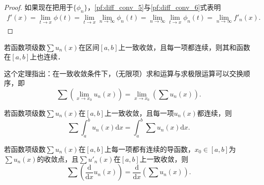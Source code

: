 \documentclass[../../main.tex]{subfiles}%
\begin{document}
\begin{proof}
如果现在把用于$\{\phi_n\}$，\eqref{pf:diff_conv_5}与\eqref{pf:diff_conv_6}式表明
\begin{align*}
f\prime \left( x \right) =\lim_{t\rightarrow x} \phi \left( t \right) =\underset{t\rightarrow x}{\lim}\underset{n\rightarrow \infty}{\lim}\phi _n\left( t \right) =\underset{n\rightarrow \infty}{\lim}\underset{t\rightarrow x}{\lim}\phi _n\left( t \right) =\lim_{n\rightarrow \infty} f\prime _n(x).
\end{align*}

\end{proof}

\begin{theorem}[连续性]\label{theorem:函数项级数连续性定理}
若函数项级数\(\sum u_n(x)\)在区间\([a, b]\)上一致收敛，且每一项都连续，则其和函数在\([a, b]\)上也连续．
\end{theorem}
\begin{note}
这个定理指出：在一致收敛条件下，（无限项）求和运算与求极限运算可以交换顺序，即
\[
\sum \left( \lim_{x \to x_0} u_n(x) \right) = \lim_{x \to x_0} \left( \sum u_n(x) \right). 
\]
\end{note}

\begin{theorem}[逐项求积]\label{theorem:函数项级数逐项求积定理}
若函数项级数\(\sum u_n(x)\)在\([a, b]\)上一致收敛，且每一项\(u_n(x)\)都连续，则
\[
\sum \int_a^b u_n(x) \mathrm{d}x = \int_a^b \sum u_n(x) \mathrm{d}x. 
\]
\end{theorem}

\begin{theorem}[逐项求导]\label{theorem:级数逐项求导定理}
若函数项级数\(\sum u_n(x)\)在\([a, b]\)上每一项都有连续的导函数，\(x_0 \in [a, b]\)为\(\sum u_n(x)\)的收敛点，且\(\sum u'_n(x)\)在\([a, b]\)上一致收敛，则
\[
\sum \left( \frac{\mathrm{d}}{\mathrm{d}x} u_n(x) \right) = \frac{\mathrm{d}}{\mathrm{d}x} \left( \sum u_n(x) \right). 
\]
\end{theorem}
\end{document}
